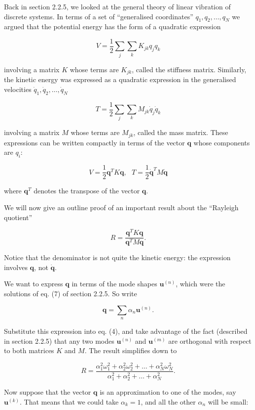   Back in section 2.2.5, we looked at the general theory of linear vibration of 
  discrete systems. In terms of a set of ``generalised coordinates'' 
  $q_1,q_2,\dots,q_N$ we argued that the potential energy has the form of a 
  quadratic expression 

  $$V=\dfrac{1}{2}\sum_j \sum_k K_{jk} q_j q_k \tag{1}$$ 

  involving a matrix $K$ whose terms are $K_{jk}$, called the stiffness matrix. 
  Similarly, the kinetic energy was expressed as a quadratic expression in the 
  generalised velocities $\dot{q}_1,\dot{q}_2,\dots,\dot{q}_N$ 

  $$T=\dfrac{1}{2}\sum_j \sum_k M_{jk} \dot{q}_j \dot{q}_k\tag{2}$$ 

  involving a matrix $M$ whose terms are $M_{jk}$, called the mass matrix. 
  These expressions can be written compactly in terms of the vector 
  $\mathbf{q}$ whose components are $q_i$: 

  $$V=\frac{1}{2} \mathbf{q}^T K \mathbf{q},~~~T=\frac{1}{2} \mathbf{\dot{q}}^T 
  M \mathbf{\dot{q}}\tag{3}$$ 

  where $\mathbf{q}^T$ denotes the transpose of the vector $\mathbf{q}$. 

  We will now give an outline proof of an important result about the ``Rayleigh 
  quotient'' 

  $$R=\frac{\mathbf{q}^T K \mathbf{q}}{\mathbf{q}^T M \mathbf{q}} .\tag{4}$$ 

  Notice that the denominator is not quite the kinetic energy: the expression 
  involves $\mathbf{q}$, not $\mathbf{\dot{q}}$. 

  We want to express $\mathbf{q}$ in terms of the mode shapes 
  $\mathbf{u}^{(n)}$, which were the solutions of eq. (7) of section 2.2.5. So 
  write 

  $$\mathbf{q}=\sum_n{\alpha_n \mathbf{u}^{(n)}} .\tag{5}$$ 

  Substitute this expression into eq. (4), and take advantage of the fact 
  (described in section 2.2.5) that any two modes $\mathbf{u}^{(n)}$ and 
  $\mathbf{u}^{(m)}$ are orthogonal with respect to both matrices $K$ and $M$. 
  The result simplifies down to 

  $$R=\frac{\alpha_1^2 \omega_1^2 + \alpha_2^2 \omega_2^2 + \dots + \alpha_N^2 
  \omega_N^2 }{\alpha_1^2 + \alpha_2^2 + \dots + \alpha_N^2 } .\tag{6}$$ 

  Now suppose that the vector $\mathbf{q}$ is an approximation to one of the 
  modes, say $\mathbf{u}^{(k)}$. That means that we could take $\alpha_k =1$, 
  and all the other $\alpha_n$ will be small: 

